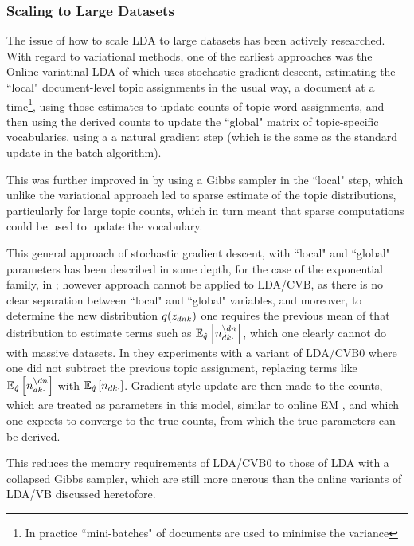 \subsubsection*{Scaling to Large Datasets}
The issue of how to scale LDA to large datasets has been actively researched. With regard to variational methods, one of the earliest approaches was the Online variatinal LDA of \cite{Hoffman2010} which uses stochastic gradient descent\cite{Bottou2004}\cite{Bottou2008}, estimating the ``local" document-level topic assignments in the usual way, a document at a time\footnote{In practice ``mini-batches" of documents are used to minimise the variance}, using those estimates to update counts of topic-word assignments, and then using the derived counts to update the ``global" matrix of topic-specific vocabularies, using a a natural gradient step (which is the same as the standard update in the batch algorithm).

This was further improved in \cite{Mimno2012a} by using a Gibbs sampler in the ``local" step, which unlike the variational approach led to sparse estimate of the topic distributions, particularly for large topic counts, which in turn meant that sparse computations could be used to update the vocabulary.

This general approach of stochastic gradient descent, with ``local" and ``global" parameters has been described in some depth, for the case of the exponential family, in \cite{Hoffman2012}; however approach cannot be applied to LDA/CVB, as there is no clear separation between ``local" and ``global" variables, and moreover, to determine the new distribution $q(\zdnk)$ one requires the previous mean of that distribution to estimate terms such as $\ex{n_{dk\cdot}^{\setminus dn}}{\hat{q}}$, which one clearly cannot do with massive datasets. In \cite{Boyles2013} they experiments with a variant of LDA/CVB0 where one did not subtract the previous topic assignment, replacing terms like $\ex{n_{dk\cdot}^{\setminus dn}}{\hat{q}}$ with $\ex{n_{dk\cdot}}{\hat{q}}$. Gradient-style update are then made to the counts, which are treated as parameters in this model, similar to online EM\cite{Cappe2009} , and which one expects to converge to the true counts, from which the true parameters can be derived. 

This reduces the memory requirements of LDA/CVB0 to those of LDA with a collapsed Gibbs sampler, which are still more onerous than the online variants of LDA/VB discussed heretofore. 


